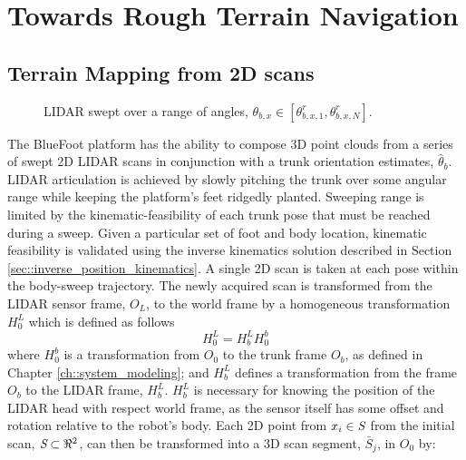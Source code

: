 	\section{Towards Rough Terrain Navigation}


		\subsection{Terrain Mapping from 2D scans}
			\label{ssec::terrain_mapping}
			\begin{figure}[h!]
				\centering
				\caption{LIDAR swept over a range of angles, $\theta_{b,x} \in [\theta_{b,x,1}^{r},\theta_{b,x,N}^{r}]$. }
				\label{fig::sensor_sweep}
			\end{figure}
			The BlueFoot platform has the ability to compose 3D point clouds from a series of swept 2D LIDAR scans in conjunction with a trunk orientation estimates, $\hat{\theta}_{b}$. LIDAR articulation is achieved by slowly pitching the trunk over some angular range while keeping the platform's feet ridgedly planted. Sweeping range is limited by the kinematic-feasibility of each trunk pose that must be reached during a sweep. Given a particular set of foot and body location, kinematic feasibility is validated using the inverse kinematics solution described in Section \ref{sec::inverse_position_kinematics}. A single 2D scan is taken at each pose within the body-sweep trajectory. The newly acquired scan is transformed from the LIDAR sensor frame, $O_{L}$, to the world frame by a homogeneous transformation $H^{L}_{0}$ which is defined as follows
				\begin{equation}
					H^{L}_{0} = H^{L}_{b} H^{b}_{0}
					\label{eq::world_to_sensor}
				\end{equation}
			where $H^{b}_{0}$ is a transformation from $O_{0}$ to the trunk frame $O_{b}$, as defined in Chapter \ref{ch::system_modeling}; and $H^{L}_{b}$ defines a transformation from the frame $O_{b}$ to the LIDAR frame, $H^{L}_{b}$. $H^{L}_{b}$ is necessary for knowing the position of the LIDAR head with respect world frame, as the sensor itself has some offset and rotation relative to the robot's body. Each 2D point from $x_{i} \in \emph{S}$ from the initial scan, $\emph{S}\subset \Re^{2}$, can then be transformed into a 3D scan segment, $\bar{S}_{j}$, in $O_{0}$ by:
